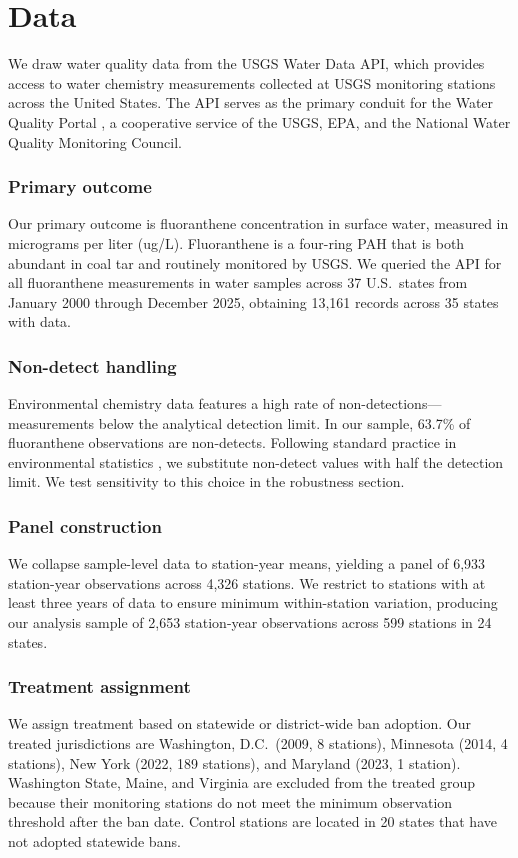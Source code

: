 \documentclass[12pt]{article}
\begin{document}
\section{Data}

We draw water quality data from the USGS Water Data API, which provides access to water chemistry measurements collected at USGS monitoring stations across the United States. The API serves as the primary conduit for the Water Quality Portal \citep{read2017water}, a cooperative service of the USGS, EPA, and the National Water Quality Monitoring Council.

\subsubsection*{Primary outcome} Our primary outcome is fluoranthene concentration in surface water, measured in micrograms per liter (ug/L). Fluoranthene is a four-ring PAH that is both abundant in coal tar and routinely monitored by USGS. We queried the API for all fluoranthene measurements in water samples across 37 U.S.\ states from January 2000 through December 2025, obtaining 13,161 records across 35 states with data.

\subsubsection*{Non-detect handling} Environmental chemistry data features a high rate of non-detections---measurements below the analytical detection limit. In our sample, 63.7\% of fluoranthene observations are non-detects. Following standard practice in environmental statistics \citep{helsel2012statistics}, we substitute non-detect values with half the detection limit. We test sensitivity to this choice in the robustness section.

\subsubsection*{Panel construction} We collapse sample-level data to station-year means, yielding a panel of 6,933 station-year observations across 4,326 stations. We restrict to stations with at least three years of data to ensure minimum within-station variation, producing our analysis sample of 2,653 station-year observations across 599 stations in 24 states.

\subsubsection*{Treatment assignment} We assign treatment based on statewide or district-wide ban adoption. Our treated jurisdictions are Washington, D.C.\ (2009, 8 stations), Minnesota (2014, 4 stations), New York (2022, 189 stations), and Maryland (2023, 1 station). Washington State, Maine, and Virginia are excluded from the treated group because their monitoring stations do not meet the minimum observation threshold after the ban date. Control stations are located in 20 states that have not adopted statewide bans.
\end{document}
